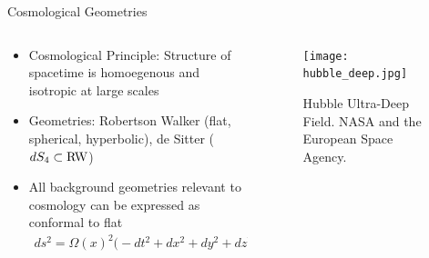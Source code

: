 \documentclass[8pt,aspectratio=1610]{beamer}
\begin{document}


\begin{frame}{Cosmological Geometries}
	\begin{columns}
	\begin{column}{0.5\linewidth}
	\begin{itemize}
		\item Cosmological Principle: Structure of spacetime is homoegenous and isotropic at large scales
		\item Geometries: Robertson Walker (flat, spherical, hyperbolic), de Sitter ($dS_4 \subset \rm{RW}$)
		\item All background geometries relevant to cosmology can be expressed as conformal to flat
	\begin{eqnarray*}
		ds^2 = \Omega(x)^2\big(-dt^2 + dx^2 + dy^2 + dz^2\big)
	\end{eqnarray*}
	\end{itemize}
	\end{column}
	\begin{column}{0.5\linewidth}
		\begin{figure}
			\texttt{[image: hubble\_deep.jpg]}
			{\caption*{Hubble Ultra-Deep Field. NASA and the European Space Agency.}}
		\end{figure}
	\end{column}
	\end{columns}
\end{frame}

\end{document}
